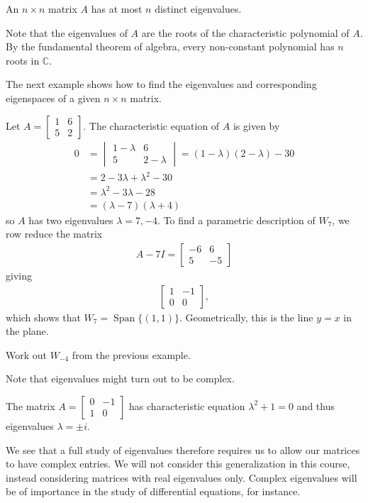 \documentclass[12pt,letterpaper,reqno]{article}
\numberwithin{equation}{section}
\newcommand{\C}{\ensuremath{\mathbb C}}
\DeclareMathOperator{\Span}{Span}
\begin{document}
\begin{prop}
An $n \times n$ matrix $A$ has at most $n$ distinct eigenvalues.	
\end{prop}

\begin{pf}
Note that the eigenvalues of $A$ are the roots of the characteristic polynomial of $A$. By the fundamental theorem of algebra, every non-constant polynomial has $n$ roots in $\C$.
\end{pf}

The next example shows how to find the eigenvalues and corresponding eigenspaces of a given $n \times n$ matrix.

\begin{example}
Let $A=\begin{bmatrix}
	1 & 6 \\
	5 & 2
\end{bmatrix}$. The characteristic equation of $A$ is given by
\begin{align*}
	0&=\begin{vmatrix}
		1-\lambda & 6 \\
		5 & 2-\lambda
	\end{vmatrix}=(1-\lambda)(2-\lambda)-30 \\
	&=2-3\lambda+\lambda^2-30 \\
	&=\lambda^2-3\lambda-28 \\
	&=(\lambda-7)(\lambda+4)
\end{align*}	
so $A$ has two eigenvalues $\lambda=7,-4$. To find a parametric description of $W_7$, we row reduce the matrix
\begin{align*}
	A-7I=\begin{bmatrix}
		-6 & 6 \\
		5 & -5
	\end{bmatrix}
\end{align*} 
giving
\begin{align*}
	\begin{bmatrix}
		1 & -1 \\
		0 & 0
	\end{bmatrix},
\end{align*}
which shows that $W_7=\Span\{(1,1)\}$. Geometrically, this is the line $y=x$ in the plane.
\end{example}

\begin{exercise}
Work out $W_{-4}$ from the previous example.	
\end{exercise}

Note that eigenvalues might turn out to be complex.
\begin{example}
The matrix $A=\begin{bmatrix}
	0 & -1 \\
	1 & 0
\end{bmatrix}$ has characteristic equation $\lambda^2+1=0$ and thus eigenvalues $\lambda=\pm i$.	
\end{example}
We see that a full study of eigenvalues therefore requires us to allow our matrices to have complex entries. We will not consider this generalization in this course, instead considering matrices with real eigenvalues only. Complex eigenvalues will be of importance in the study of differential equations, for instance.
\end{document}
